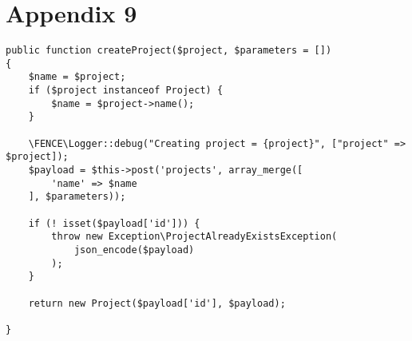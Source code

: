 \section*{Appendix 9}
\label{sec:app9}

\begin{lstlisting}
public function createProject($project, $parameters = [])
{
    $name = $project;
    if ($project instanceof Project) {
        $name = $project->name();
    }

    \FENCE\Logger::debug("Creating project = {project}", ["project" => $project]);
    $payload = $this->post('projects', array_merge([
        'name' => $name
    ], $parameters));

    if (! isset($payload['id'])) {
        throw new Exception\ProjectAlreadyExistsException(
            json_encode($payload)
        );
    }

    return new Project($payload['id'], $payload);

}
\end{lstlisting}